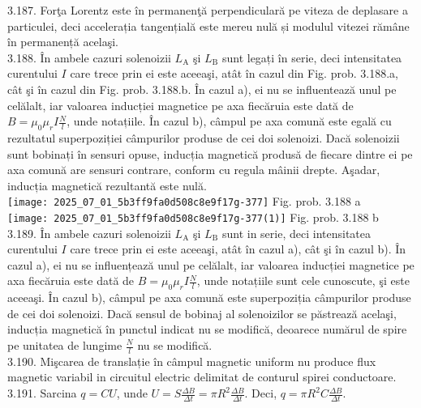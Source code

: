 3.187. Forţa Lorentz este în permanenţă perpendiculară pe viteza de deplasare a particulei, deci accelerația tangențială este mereu nulă și modulul vitezei rămâne în permanență acelaşi.\\

3.188. În ambele cazuri solenoizii $L_{\mathrm{A}}$ şi $L_{\mathrm{B}}$ sunt legați în serie, deci intensitatea curentului $I$ care trece prin ei este aceeaşi, atât în cazul din Fig. prob. 3.188.a, cât şi în cazul din Fig. prob. 3.188.b. În cazul a), ei nu se influentează unul pe celălalt, iar valoarea inducției magnetice pe axa fiecăruia este dată de $B=\mu_{0} \mu_{r} I \frac{N}{l}$, unde notațiile. În cazul b), câmpul pe axa comună este egală cu rezultatul superpoziției câmpurilor produse de cei doi solenoizi. Dacă solenoizii sunt bobinați în sensuri opuse, inducția magnetică produsă de fiecare dintre ei pe axa comună are sensuri contrare, conform cu regula mâinii drepte. Aşadar, inducția magnetică rezultantă este nulă.\\ \texttt{[image: 2025\_07\_01\_5b3ff9fa0d508c8e9f17g-377]} Fig. prob. 3.188 a\\ \texttt{[image: 2025\_07\_01\_5b3ff9fa0d508c8e9f17g-377(1)]} Fig. prob. 3.188 b\\

3.189. În ambele cazuri solenoizii $L_{\mathrm{A}}$ şi $L_{\mathrm{B}}$ sunt in serie, deci intensitatea curentului $I$ care trece prin ei este aceeaşi, atât în cazul a), cât şi în cazul b). În cazul a), ei nu se influențează unul pe celălalt, iar valoarea inducției magnetice pe axa fiecăruia este dată de $B=\mu_{0} \mu_{r} I \frac{N}{l}$, unde notațiile sunt cele cunoscute, şi este aceeaşi. În cazul b), câmpul pe axa comună este superpoziția câmpurilor produse de cei doi solenoizi. Dacă sensul de bobinaj al solenoizilor se păstrează acelaşi, inducția magnetică în punctul indicat nu se modifică, deoarece numărul de spire pe unitatea de lungime $\frac{N}{l}$ nu se modifică.\\

3.190. Mişcarea de translație în câmpul magnetic uniform nu produce flux magnetic variabil in circuitul electric delimitat de conturul spirei conductoare.\\

3.191. Sarcina $q=C U$, unde $U=S \frac{\Delta B}{\Delta t}=\pi R^{2} \frac{\Delta B}{\Delta t}$. Deci, $q=\pi R^{2} C \frac{\Delta B}{\Delta t}$.\\

